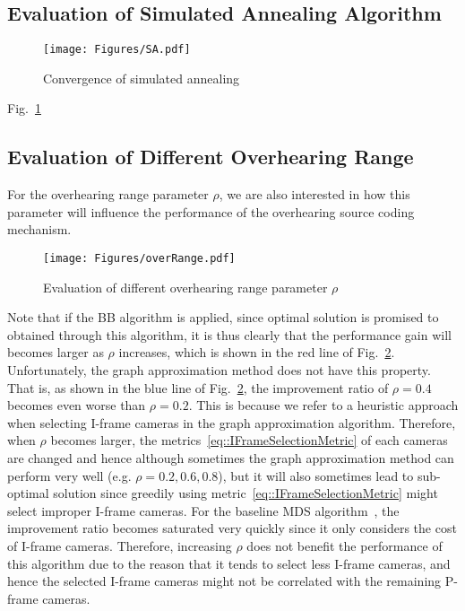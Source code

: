 \subsection{Evaluation of Simulated Annealing Algorithm}
\begin{figure}
\begin{center}
\texttt{[image: Figures/SA.pdf]}
\caption{\label{fig::SAconverge} Convergence of simulated annealing}
\end{center}
\end{figure}
Fig.~\ref{fig::SAconverge}

\subsection{Evaluation of Different Overhearing Range}
For the overhearing range parameter $\rho$, we are also interested in how this parameter will influence the performance of the overhearing source coding mechanism.
%
\begin{figure}
\begin{center}
\texttt{[image: Figures/overRange.pdf]}
\caption{\label{fig::evaOverRange}Evaluation of different overhearing range parameter $\rho$}
\end{center}
\end{figure}
%
Note that if the BB algorithm is applied, since optimal solution is promised to obtained through this algorithm, it is thus clearly that the performance gain will becomes larger as $\rho$ increases, which is shown in the red line of Fig.~\ref{fig::evaOverRange}.
Unfortunately, the graph approximation method does not have this property.
That is, as shown in the blue line of Fig.~\ref{fig::evaOverRange}, the improvement ratio of $\rho = 0.4$ becomes even worse than $\rho = 0.2$.
This is because we refer to a heuristic approach when selecting I-frame cameras in the graph approximation algorithm.
Therefore, when $\rho$ becomes larger, the metrics~\eqref{eq::IFrameSelectionMetric} of each cameras are changed and hence although sometimes the graph approximation method can perform very well (e.g. $\rho = 0.2,0.6,0.8$), but it will also sometimes lead to sub-optimal solution since greedily using metric~\eqref{eq::IFrameSelectionMetric} might select improper I-frame cameras.
For the baseline MDS algorithm~\cite{MWDS_baseline}, the improvement ratio becomes saturated very quickly since it only considers the cost of I-frame cameras.
Therefore, increasing $\rho$ does not benefit the performance of this algorithm due to the reason that it tends to select less I-frame cameras, and hence the selected I-frame cameras might not be correlated with the remaining P-frame cameras.
%

